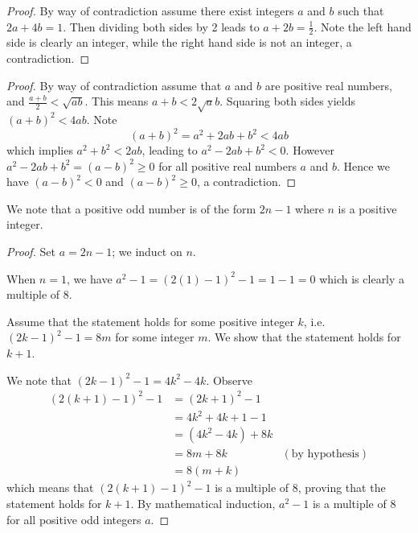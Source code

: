\begin{questions}
    \item \begin{proof}
        By way of contradiction assume there exist integers $a$ and $b$ such that $2a + 4b = 1$. Then dividing both sides by 2 leads to $a + 2b = \frac12$. Note the left hand side is clearly an integer, while the right hand side is not an integer, a contradiction.
    \end{proof}

    \item \begin{proof}
        By way of contradiction assume that $a$ and $b$ are positive real numbers, and $\frac{a+b}{2} < \sqrt{ab}$. This means $a+b<2\sqrt ab$. Squaring both sides yields $(a+b)^2 < 4ab$. Note
        \[
            (a+b)^2 = a^2 + 2ab + b^2 < 4ab
        \]
        which implies $a^2 + b^2 < 2ab$, leading to $a^2 - 2ab + b^2 < 0$. However $a^2 - 2ab + b^2 = (a-b)^2 \geq 0$ for all positive real numbers $a$ and $b$. Hence we have $(a-b)^2 < 0$ and $(a-b)^2 \geq 0$, a contradiction.
    \end{proof}

    \item We note that a positive odd number is of the form $2n - 1$ where $n$ is a positive integer.

    \begin{proof}
        Set $a = 2n - 1$; we induct on $n$.

        When $n = 1$, we have $a^2 - 1 = (2(1) - 1)^2 - 1 = 1 - 1 = 0$ which is clearly a multiple of 8.

        Assume that the statement holds for some positive integer $k$, i.e. $(2k-1)^2 - 1 = 8m$ for some integer $m$. We show that the statement holds for $k + 1$.

        We note that $(2k-1)^2 - 1 = 4k^2 - 4k$. Observe
        \begin{align*}
            (2(k+1)-1)^2 - 1 &= (2k+1)^2 - 1\\
            &= 4k^2 + 4k + 1 - 1\\
            &= (4k^2 - 4k) + 8k\\
            &= 8m + 8k & (\text{by hypothesis})\\
            &= 8(m+k)
        \end{align*}
        which means that $(2(k+1)-1)^2 - 1$ is a multiple of 8, proving that the statement holds for $k+1$. By mathematical induction, $a^2 - 1$ is a multiple of 8 for all positive odd integers $a$.
    \end{proof}


\end{questions}
